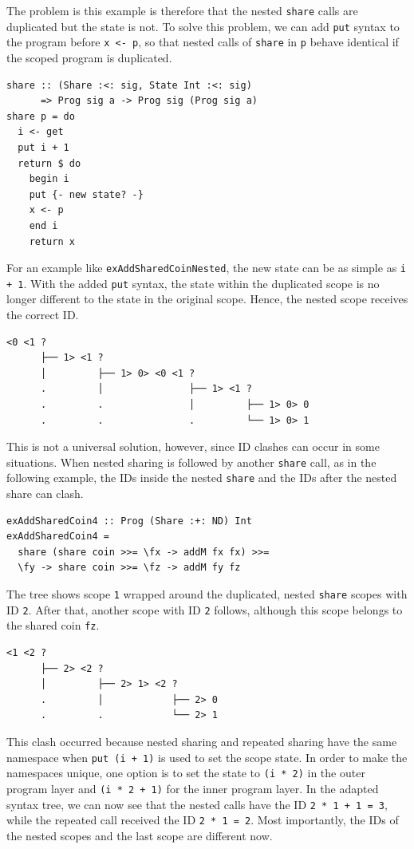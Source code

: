 \documentclass[a4paper, 11pt, fleqn, twoside, abstract=on]{scrreprt}
\newcommand{\hinl}[1]{\texttt{#1}}
\begin{document}
The problem is this example is therefore that the nested \hinl{share} calls are duplicated but the state is not.
To solve this problem, we can add \hinl{put} syntax to the program before \hinl{x <- p}, so that  nested calls of \hinl{share} in \hinl{p} behave identical if the scoped program is duplicated.

\begin{verbatim}
share :: (Share :<: sig, State Int :<: sig) 
      => Prog sig a -> Prog sig (Prog sig a)
share p = do
  i <- get
  put i + 1
  return $ do
    begin i
    put {- new state? -}
    x <- p
    end i
    return x
\end{verbatim}

For an example like \hinl{exAddSharedCoinNested}, the new state can be as simple as \hinl{i + 1}.
With the added \hinl{put} syntax, the state within the duplicated scope is no longer different to the state in the original scope.
Hence, the nested scope receives the correct ID.

\begin{verbatim}
<0 <1 ? 
      ├── 1> <1 ? 
      │         ├── 1> 0> <0 <1 ? 
      .         │               ├── 1> <1 ? 
      .         .               │         ├── 1> 0> 0
      .         .               .         └── 1> 0> 1
\end{verbatim}

This is not a universal solution, however, since ID clashes can occur in some situations.
When nested sharing is followed by another \hinl{share} call, as in the following example, the IDs inside the nested \hinl{share} and the IDs after the nested share can clash.

\begin{verbatim}
exAddSharedCoin4 :: Prog (Share :+: ND) Int
exAddSharedCoin4 =
  share (share coin >>= \fx -> addM fx fx) >>=
  \fy -> share coin >>= \fz -> addM fy fz
\end{verbatim}

The tree shows scope \hinl{1} wrapped around the duplicated, nested \hinl{share} scopes with ID \hinl{2}.
After that, another scope with ID \hinl{2} follows, although this scope belongs to the shared coin \hinl{fz}.

\begin{verbatim}
<1 <2 ? 
      ├── 2> <2 ? 
      │         ├── 2> 1> <2 ?
      .         │            ├── 2> 0
      .         .            └── 2> 1
\end{verbatim}

This clash occurred because nested sharing and repeated sharing have the same namespace when \hinl{put (i + 1)} is used to set the scope state.
In order to make the namespaces unique, one option is to set the state to \hinl{(i * 2)} in the outer program layer and \hinl{(i * 2 + 1)} for the inner program layer.
In the adapted syntax tree, we can now see that the nested calls have the ID \hinl{2 * 1 + 1 = 3}, while the repeated call received the ID \hinl{2 * 1 = 2}.
Most importantly, the IDs of the nested scopes and the last scope are different now.
\end{document}
